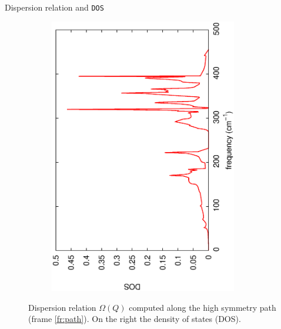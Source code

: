\documentclass[dvipsnames]{beamer}
\begin{document}
\begin{frame}{Dispersion relation and \texttt{DOS}}
\begin{figure}
\begin{subfigure}{0.25\textwidth}
{	\includegraphics[trim=0 4cm 0 -2cm,clip,angle=180,origin=c,width=0.9\textwidth, height=0.75\textheight]{graphs/mos2.phdos.ps}
	}
	\end{subfigure}
	\caption{Dispersion relation $\Omega(Q)$ computed along the high symmetry path (frame \ref{fr:path}). On the right the density of states (DOS).}
	\end{figure}
	\end{frame}
	
\end{document}
